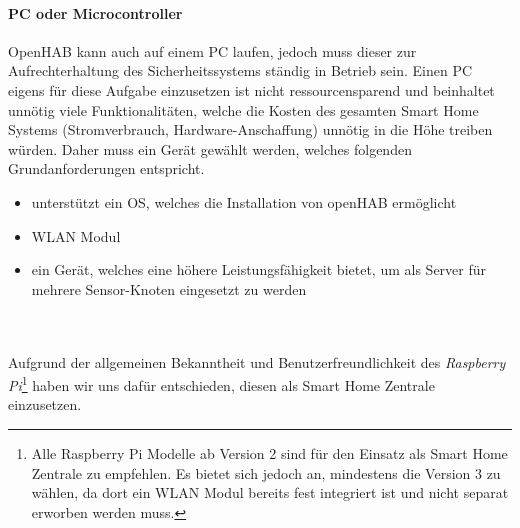 \documentclass[a4paper,10pt,twocolumn]{article}
\begin{document}
\paragraph{PC oder Microcontroller} OpenHAB kann auch auf einem PC laufen, jedoch muss dieser zur Aufrechterhaltung des Sicherheitssystems ständig in Betrieb sein. Einen PC eigens für diese Aufgabe einzusetzen ist nicht ressourcensparend und beinhaltet unnötig viele Funktionalitäten, welche die Kosten des gesamten Smart Home Systems (Stromverbrauch, Hardware-Anschaffung) unnötig in die Höhe treiben würden. Daher muss ein Gerät gewählt werden, welches folgenden Grundanforderungen entspricht.
\begin{itemize}
    \item unterstützt ein OS, welches die Installation von openHAB ermöglicht
    \item WLAN Modul 
    \item ein Gerät, welches eine höhere Leistungsfähigkeit bietet, um als Server für mehrere Sensor-Knoten eingesetzt zu werden
\end{itemize}\\\\
Aufgrund der allgemeinen Bekanntheit und Benutzerfreundlichkeit des \textit{Raspberry Pi}\footnote{Alle Raspberry Pi Modelle ab Version 2 sind für den Einsatz als Smart Home Zentrale zu empfehlen. Es bietet sich jedoch an, mindestens die Version 3 zu wählen, da dort ein WLAN Modul bereits fest integriert ist und nicht separat erworben werden muss.} haben wir uns dafür entschieden, diesen als Smart Home Zentrale einzusetzen.
\end{document}
